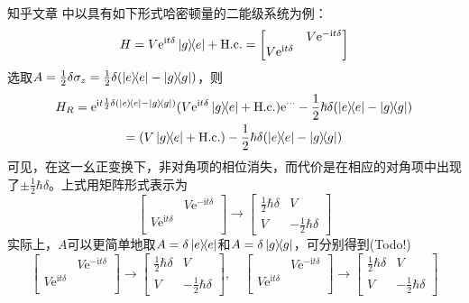 \documentclass[
fontsetup = font-setup-open.tex,
titlesetup = titles-setup.tex
]{AJbook}
\numberwithin{equation}{section}
\begin{document}
知乎文章 \cite{rotatecoordsys} 中以具有如下形式哈密顿量的二能级系统为例：
\begin{equation}\label{key}
H=V\mathrm{e}^{\mathrm{i}t\delta}\ketbra{g}{e}+\mathrm{H.c.}
=\begin{bmatrix}
&V\mathrm{e}^{-\mathrm{i}t\delta}\\
V\mathrm{e}^{\mathrm{i}t\delta}&\\
\end{bmatrix}
\end{equation}
选取$ A= \frac{1}{2}\delta\sigma_z=\frac{1}{2}\delta(\ketbra{e}{e}-\ketbra{g}{g}) $，则
\begin{equation}\label{key}
\begin{gathered}
H_R=\mathrm{e}^{\mathrm{i}t\frac{1}{2}\delta(\ketbra{e}{e}-\ketbra{g}{g})}(V\mathrm{e}^{\mathrm{i}t\delta}\ketbra{g}{e}+\mathrm{H.c.})\mathrm{e}^{\cdots}-\frac{1}{2}\hbar\delta(\ketbra{e}{e}-\ketbra{g}{g})\\
=(V\ketbra{g}{e}+\mathrm{H.c.})-\frac{1}{2}\hbar\delta(\ketbra{e}{e}-\ketbra{g}{g})
\end{gathered}
\end{equation}
可见，在这一幺正变换下，非对角项的相位消失，而代价是在相应的对角项中出现了$ \pm\frac{1}{2}\hbar\delta $。上式用矩阵形式表示为
\begin{equation}\label{key}
\begin{bmatrix}
&V\mathrm{e}^{-\mathrm{i}t\delta}\\
V\mathrm{e}^{\mathrm{i}t\delta}&\\
\end{bmatrix}\to
\begin{bmatrix}
\frac{1}{2}\hbar\delta & V \\
V & -\frac{1}{2}\hbar\delta
\end{bmatrix}
\end{equation}
实际上，$ A $可以更简单地取$ A= \delta\ketbra{e}{e} $和$ A= \delta\ketbra{g}{g} $，可分别得到(Todo!)
\begin{equation}\label{key}
\begin{bmatrix}
&V\mathrm{e}^{-\mathrm{i}t\delta}\\
V\mathrm{e}^{\mathrm{i}t\delta}&\\
\end{bmatrix}\to
\begin{bmatrix}
\frac{1}{2}\hbar\delta & V \\
V & -\frac{1}{2}\hbar\delta
\end{bmatrix},\quad
\begin{bmatrix}
&V\mathrm{e}^{-\mathrm{i}t\delta}\\
V\mathrm{e}^{\mathrm{i}t\delta}&\\
\end{bmatrix}\to
\begin{bmatrix}
\frac{1}{2}\hbar\delta & V \\
V & -\frac{1}{2}\hbar\delta
\end{bmatrix}
\end{equation}
\end{document}
